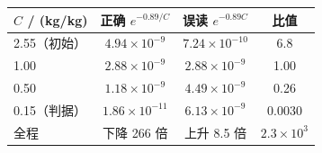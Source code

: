 \begin{tabular}{lccc}
\toprule
$C$ / (kg/kg) & 正确 $e^{-0.89/C}$ & 误读 $e^{-0.89C}$ & 比值 \\
\midrule
2.55（初始） & $4.94\times10^{-9}$ & $7.24\times10^{-10}$ & 6.8 \\
1.00 & $2.88\times10^{-9}$ & $2.88\times10^{-9}$ & 1.00 \\
0.50 & $1.18\times10^{-9}$ & $4.49\times10^{-9}$ & 0.26 \\
0.15（判据） & $1.86\times10^{-11}$ & $6.13\times10^{-9}$ & 0.0030 \\
全程 & 下降 266 倍 & 上升 8.5 倍 & $2.3\times10^{3}$ \\
\bottomrule
\end{tabular}
